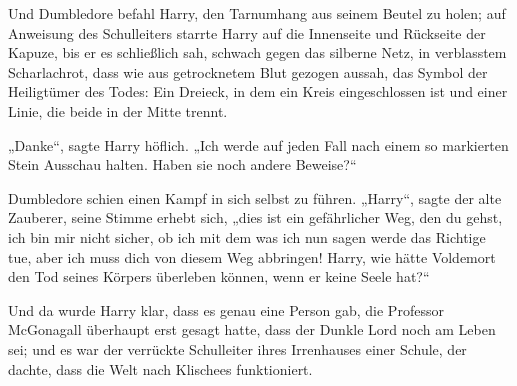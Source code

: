 Und Dumbledore befahl Harry, den Tarnumhang aus seinem Beutel zu holen; auf Anweisung des Schulleiters starrte Harry auf die Innenseite und Rückseite der Kapuze, bis er es schließlich sah, schwach gegen das silberne Netz, in verblasstem Scharlachrot, dass wie aus getrocknetem Blut gezogen aussah, das Symbol der Heiligtümer des Todes: Ein Dreieck, in dem ein Kreis eingeschlossen ist und einer Linie, die beide in der Mitte trennt.

„Danke“, sagte Harry höflich.
„Ich werde auf jeden Fall nach einem so markierten Stein Ausschau halten. Haben sie noch andere Beweise?“

Dumbledore schien einen Kampf in sich selbst zu führen.
„Harry“, sagte der alte Zauberer, seine Stimme erhebt sich, „dies ist ein gefährlicher Weg, den du gehst, ich bin mir nicht sicher, ob ich mit dem was ich nun sagen werde das Richtige tue, aber ich muss dich von diesem Weg abbringen! Harry, wie hätte Voldemort den Tod seines Körpers überleben können, wenn er keine Seele hat?“

Und da wurde Harry klar, dass es genau eine Person gab, die Professor McGonagall überhaupt erst gesagt hatte, dass der Dunkle Lord noch am Leben sei; und es war der verrückte Schulleiter ihres Irrenhauses einer Schule, der dachte, dass die Welt nach Klischees funktioniert.

